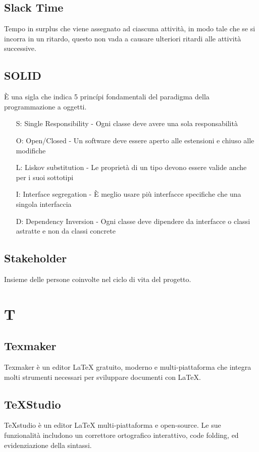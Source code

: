 {	\subsection{Slack Time}
	Tempo in surplus che viene assegnato ad ciascuna attività, in modo tale che se si incorra in un ritardo, questo non vada a causare ulteriori ritardi alle attività successive.
	
	\subsection{SOLID}
	\`E una sigla che indica 5 princ\'{i}pi fondamentali del paradigma della programmazione a oggetti.
	\begin{itemize}
		\item[S:] Single Responsibility - Ogni classe deve avere una sola responsabilità
		\item[O:] Open/Closed - Un software deve essere aperto alle estensioni e chiuso alle modifiche
		\item[L:] Liskov substitution - Le proprietà di un tipo devono essere valide anche per i suoi sottotipi
		\item[I:] Interface segregation - \`E meglio usare più interfacce specifiche che una singola interfaccia
		\item[D:] Dependency Inversion - Ogni classe deve dipendere da interfacce o classi astratte e non da classi concrete
	\end{itemize}	 
	
	\subsection{Stakeholder}
	Insieme delle persone coinvolte nel ciclo di vita del progetto.
	
	\section{T}
	\subsection{Texmaker} 
	Texmaker è un editor LaTeX gratuito, moderno e multi-piattaforma che integra molti strumenti necessari per sviluppare documenti con LaTeX. 
	
	\subsection{TeXStudio} 
	TeXstudio è un editor LaTeX multi-piattaforma e open-source. Le sue funzionalità includono un correttore ortografico interattivo, code folding, ed evidenziazione della sintassi.
	
}
